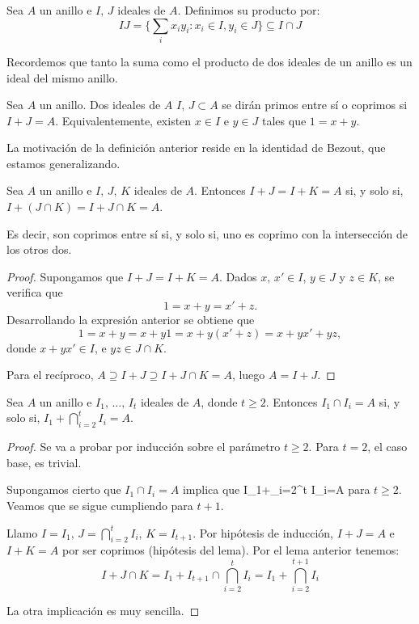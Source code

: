 \begin{df}
  Sea \(A\) un anillo e \(I,\,J\) ideales de \(A\). Definimos su producto por:
  \[
    IJ=\{\sum_i x_i y_i: x_i\in I, y_i\in J\}\subseteq I\cap J
  \]
\end{df}


\noindent Recordemos que tanto la suma como el producto de dos ideales de un anillo es un ideal del mismo anillo.

\begin{df}
  Sea \(A\) un anillo. Dos ideales de \(A\) \(I,\,J\subset A\) se dirán primos entre sí
  o coprimos si \(I+J=A\). Equivalentemente, existen \(x\in I\) e \(y\in J\) tales que
  \(1=x+y\).
\end{df}

\noindent La motivación de la definición anterior reside en la identidad
de Bezout, que estamos generalizando.

\begin{lema}
  Sea \(A\) un anillo e \(I,\,J,\,K\) ideales de \(A\).
  Entonces \(I+J=I+K=A\) si, y solo si, \(I+(J\cap K)=I+J\cap K=A\).

  Es decir, son coprimos entre sí si, y solo si, uno es coprimo
  con la intersección de los otros dos.
\end{lema}
\begin{proof}
  Supongamos que \(I+J=I+K=A\). Dados \(x,\,x'\in I\), \(y\in J\) y \(z\in K\),
  se verifica que \[1=x+y=x'+z.\] Desarrollando la expresión anterior se obtiene que
  \[1=x+y=x+y1=x+y(x'+z)=x+yx'+yz,\]
  donde \(x+yx'\in I\), e \(yz\in J\cap K\).

  Para el recíproco, \(A\supseteq I+J\supseteq I+J\cap K=A\),
  luego \(A=I+J\).
\end{proof}

\begin{lema}
  Sea \(A\) un anillo e \(I_1,\,\ldots,\,I_t\) ideales de \(A\), donde
  \(t \ge 2\).
  Entonces \(I_1\cap I_i=A\) si, y solo si, \(I_1+\bigcap_{i=2}^t I_i=A\).
\end{lema}
\begin{proof}
  Se va a probar por inducción sobre el parámetro \(t \ge 2\).
  Para \(t=2\), el caso base, es trivial.

  Supongamos cierto que \(I_1\cap I_i=A\) implica que
  I_1+\bigcap_{i=2}^t I_i=A\) para \(t \ge 2\). Veamos que se sigue cumpliendo
  para \(t+1\).

  Llamo \(I=I_1\), \(J=\bigcap_{i=2}^t I_i\), \(K=I_{t+1}\).
  Por hipótesis de inducción, \(I+J=A\) e \(I+K=A\) por ser coprimos
  (hipótesis del lema). Por el lema anterior tenemos:
  \[
    I+J\cap K=I_1+I_{t+1}\cap \bigcap_{i=2}^{t}
    I_i =I_1 + \bigcap_{i=2}^{t+1} I_i
  \]

  La otra implicación es muy sencilla.
\end{proof}


